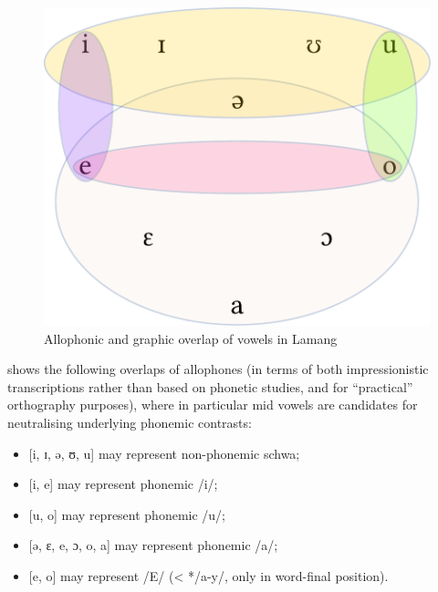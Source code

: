 \documentclass[output=paper]{langscibook}
\begin{document}
\begin{figure}
\caption{Allophonic and graphic overlap of vowels in Lamang}
\label{fig:wolff:4}
\includegraphics[height=.3\textheight]{figures/vowels_wolff.pdf}
\end{figure}

 shows the following overlaps of allophones (in terms of both impressionistic transcriptions rather than based on phonetic studies, and for ``practical'' orthography purposes), where in particular mid vowels are candidates for neutralising underlying phonemic contrasts:

\begin{itemize}
  \item{} [i, ɪ, ə, ʊ, u]    may represent non-phonemic schwa;
  \item{} [i, e]      may represent phonemic /i/;
  \item{} [u, o]      may represent phonemic /u/;
  \item{} [ə, ɛ, e, ɔ, o, a]  may represent phonemic /a/;
  \item{} [e, o]      may represent /E/ (< */a-y/, only in word-final position).
\end{itemize}
\end{document}
